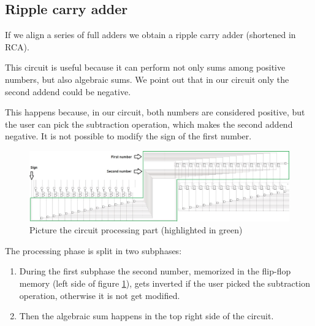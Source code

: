 \documentclass{article}
\begin{document}
\subsection{Ripple carry adder} \label{RCA_Section}

If we align a series of full adders we obtain a ripple carry adder (shortened in RCA).

\vspace{3mm}

This circuit is useful because it can perform not only sums among positive numbers, but also algebraic sums. We point out that in our circuit only the second addend could be negative.

\vspace{3mm}

This happens because, in our circuit, both numbers are considered positive, but the user can pick the subtraction operation, which makes the second addend negative. It is not possible to modify the sign of the first number.

\vspace{3mm}








\begin{table}
  
\end{table}



















\clearpage
\begin{figure}[h]
  \centering
  \includegraphics[scale=0.43]{SC_Processing_Total.JPG}
  \caption{Picture the circuit processing part (highlighted in green)}
  \label{Processing_Total}
\end{figure}

The processing phase is split in two subphases:
\begin{enumerate}
  \item During the first subphase the second number, memorized in the flip-flop memory (left side of figure \ref{Processing_Total}), gets inverted if the user picked the subtraction operation, otherwise it is not get modified.
  \item Then the algebraic sum happens in the top right side of the circuit.
\end{enumerate}
\end{document}
